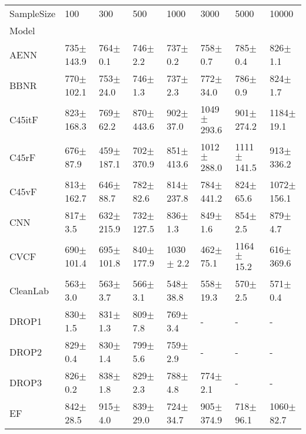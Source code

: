 \begin{tabular}{llllllll}
\toprule
SampleSize &           100   &            300   &           500   &           1000  &            3000  &            5000  &            10000 \\
Model            &                 &                  &                 &                 &                  &                  &                  \\
\midrule
AENN             &  735$\pm$ 143.9 &     764$\pm$ 0.1 &    746$\pm$ 2.2 &    737$\pm$ 0.2 &     758$\pm$ 0.7 &     785$\pm$ 0.4 &     826$\pm$ 1.1 \\
BBNR             &  770$\pm$ 102.1 &    753$\pm$ 24.0 &    746$\pm$ 1.3 &    737$\pm$ 2.3 &    772$\pm$ 34.0 &     786$\pm$ 0.9 &     824$\pm$ 1.7 \\
C45itF           &  823$\pm$ 168.3 &    769$\pm$ 62.2 &  870$\pm$ 443.6 &   902$\pm$ 37.0 &  1049$\pm$ 293.6 &   901$\pm$ 274.2 &   1184$\pm$ 19.1 \\
C45rF            &   676$\pm$ 87.9 &   459$\pm$ 187.1 &  702$\pm$ 370.9 &  851$\pm$ 413.6 &  1012$\pm$ 288.0 &  1111$\pm$ 141.5 &   913$\pm$ 336.2 \\
C45vF            &  813$\pm$ 162.7 &    646$\pm$ 88.7 &   782$\pm$ 82.6 &  814$\pm$ 237.8 &   784$\pm$ 441.2 &    824$\pm$ 65.6 &  1072$\pm$ 156.1 \\
CNN              &    817$\pm$ 3.5 &   632$\pm$ 215.9 &  732$\pm$ 127.5 &    836$\pm$ 1.3 &     849$\pm$ 1.6 &     854$\pm$ 2.5 &     879$\pm$ 4.7 \\
CVCF             &  690$\pm$ 101.4 &   695$\pm$ 101.8 &  840$\pm$ 177.9 &   1030$\pm$ 2.2 &    462$\pm$ 75.1 &   1164$\pm$ 15.2 &   616$\pm$ 369.6 \\
CleanLab         &    563$\pm$ 3.0 &     563$\pm$ 3.7 &    566$\pm$ 3.1 &   548$\pm$ 38.8 &    558$\pm$ 19.3 &     570$\pm$ 2.5 &     571$\pm$ 0.4 \\
DROP1            &    830$\pm$ 1.5 &     831$\pm$ 1.3 &    809$\pm$ 7.8 &    769$\pm$ 3.4 &                - &                - &                - \\
DROP2            &    829$\pm$ 0.4 &     830$\pm$ 1.4 &    799$\pm$ 5.6 &    759$\pm$ 2.9 &                - &                - &                - \\
DROP3            &    826$\pm$ 0.2 &     838$\pm$ 1.8 &    829$\pm$ 2.3 &    788$\pm$ 4.8 &     774$\pm$ 2.1 &                - &                - \\
EF               &   842$\pm$ 28.5 &     915$\pm$ 4.0 &   839$\pm$ 29.0 &   724$\pm$ 34.7 &   905$\pm$ 374.9 &    718$\pm$ 96.1 &   1060$\pm$ 82.7 \\

\end{tabular}
